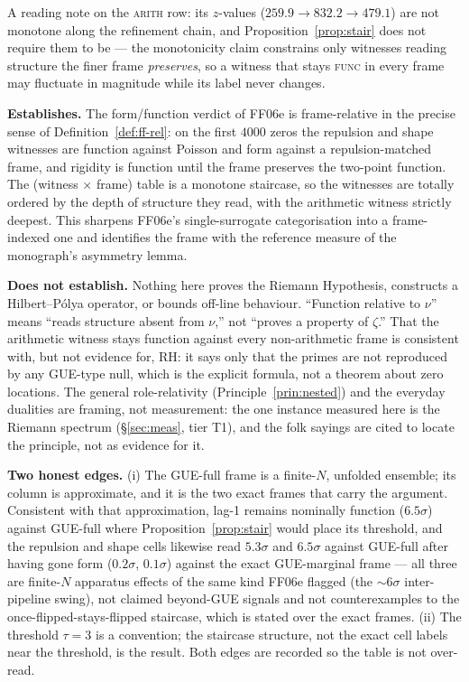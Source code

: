 \documentclass[11pt]{article}
\theoremstyle{definition}
\theoremstyle{plain}
\begin{document}
A reading note on the \textsc{arith} row: its $z$-values ($259.9 \to 832.2 \to 479.1$) are not monotone along the refinement chain, and Proposition~\ref{prop:stair} does not require them to be --- the monotonicity claim constrains only witnesses reading structure the finer frame \emph{preserves}, so a witness that stays \textsc{func} in every frame may fluctuate in magnitude while its label never changes.

\textbf{Establishes.} The form/function verdict of FF06e is frame-relative in the precise sense of Definition~\ref{def:ff-rel}: on the first $4000$ zeros the repulsion and shape witnesses are function against Poisson and form against a repulsion-matched frame, and rigidity is function until the frame preserves the two-point function. The (witness $\times$ frame) table is a monotone staircase, so the witnesses are totally ordered by the depth of structure they read, with the arithmetic witness strictly deepest. This sharpens FF06e's single-surrogate categorisation into a frame-indexed one and identifies the frame with the reference measure of the monograph's asymmetry lemma.

\textbf{Does not establish.} Nothing here proves the Riemann Hypothesis, constructs a Hilbert--P\'olya operator, or bounds off-line behaviour. ``Function relative to $\nu$'' means ``reads structure absent from $\nu$,'' not ``proves a property of $\zeta$.'' That the arithmetic witness stays function against every non-arithmetic frame is consistent with, but not evidence for, RH: it says only that the primes are not reproduced by any GUE-type null, which is the explicit formula, not a theorem about zero locations. The general role-relativity (Principle~\ref{prin:nested}) and the everyday dualities are framing, not measurement: the one instance measured here is the Riemann spectrum (\S\ref{sec:meas}, tier T1), and the folk sayings are cited to locate the principle, not as evidence for it.

\textbf{Two honest edges.} (i) The GUE-full frame is a finite-$N$, unfolded ensemble; its column is approximate, and it is the two exact frames that carry the argument. Consistent with that approximation, lag-1 remains nominally function ($6.5\sigma$) against GUE-full where Proposition~\ref{prop:stair} would place its threshold, and the repulsion and shape cells likewise read $5.3\sigma$ and $6.5\sigma$ against GUE-full after having gone form ($0.2\sigma$, $0.1\sigma$) against the exact GUE-marginal frame --- all three are finite-$N$ apparatus effects of the same kind FF06e flagged (the $\sim\!6\sigma$ inter-pipeline swing), not claimed beyond-GUE signals and not counterexamples to the once-flipped-stays-flipped staircase, which is stated over the exact frames. (ii) The threshold $\tau=3$ is a convention; the staircase structure, not the exact cell labels near the threshold, is the result. Both edges are recorded so the table is not over-read.
\end{document}
